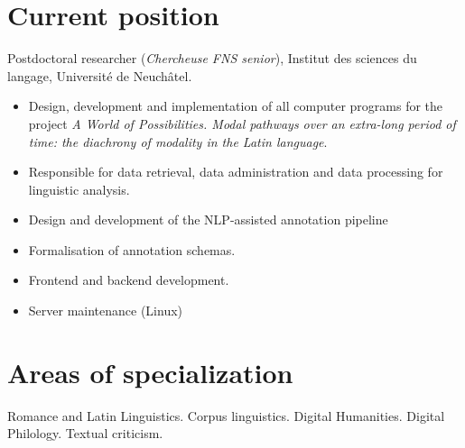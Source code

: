 \documentclass[11pt, a4paper]{article}
\newcommand{\years}[1]{\marginnote{\scriptsize #1}}
\begin{document}
\section{Current position}
\years{01/2021--}Postdoctoral researcher (\emph{Chercheuse FNS senior}), Institut des sciences du langage, Université de Neuchâtel.
\textcolor{black!62!white}{
\begin{itemize}[noitemsep,topsep=0pt]
 \item Design, development and implementation of all computer programs for the project \textit{A World of Possibilities. Modal pathways over an extra-long period of time: the diachrony of modality in the Latin language}.
\item Responsible for data retrieval, data administration and data processing for linguistic analysis.
\item Design and development of the NLP-assisted annotation pipeline 
\item Formalisation of annotation schemas.
\item Frontend and backend development.
\item Server maintenance (Linux)
\end{itemize}}


\section{Areas of specialization}
Romance and Latin Linguistics. Corpus linguistics. Digital Humanities. Digital Philology. Textual criticism.

\end{document}
